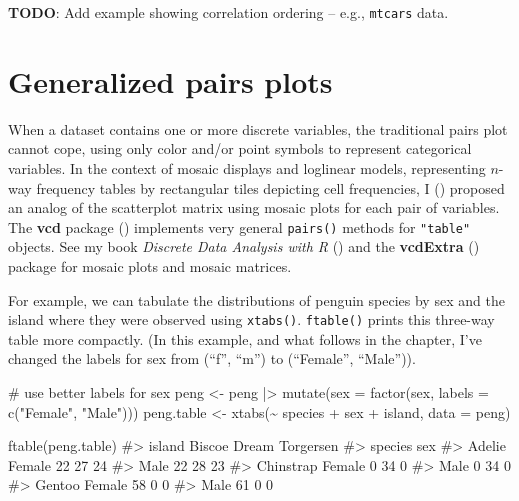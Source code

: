 \documentclass[
  letterpaper,
  10pt,
  krantz2]{krantz}
\makeatletter
\newenvironment{Shaded}{\begin{snugshade}}{\end{snugshade}}
\newcommand{\AttributeTok}[1]{\textcolor[rgb]{0.40,0.45,0.13}{#1}}
\newcommand{\CommentTok}[1]{\textcolor[rgb]{0.37,0.37,0.37}{#1}}
\newcommand{\FunctionTok}[1]{\textcolor[rgb]{0.28,0.35,0.67}{#1}}
\newcommand{\NormalTok}[1]{\textcolor[rgb]{0.00,0.23,0.31}{#1}}
\newcommand{\OtherTok}[1]{\textcolor[rgb]{0.00,0.23,0.31}{#1}}
\newcommand{\SpecialCharTok}[1]{\textcolor[rgb]{0.37,0.37,0.37}{#1}}
\newcommand{\StringTok}[1]{\textcolor[rgb]{0.13,0.47,0.30}{#1}}
\newenvironment{kframe}{%
  \medskip{}
  \setlength{\fboxsep}{.8em}
  \def\at@end@of@kframe{}%
  \ifinner\ifhmode%
  \def\at@end@of@kframe{\end{minipage}}%
  \begin{minipage}{\columnwidth}%
  \fi\fi%
  \def\FrameCommand##1{\hskip\@totalleftmargin \hskip-\fboxsep
  \colorbox{shadecolor}{##1}\hskip-\fboxsep
      \hskip-\linewidth \hskip-\@totalleftmargin \hskip\columnwidth}%
  \MakeFramed {\advance\hsize-\width
    \@totalleftmargin\z@ \linewidth\hsize
    \@setminipage}}%
{\par\unskip\endMakeFramed%
  \at@end@of@kframe}
\renewenvironment{Shaded}{\begin{kframe}}{\end{kframe}}
\makeatother
\begin{document}
\textbf{TODO}: Add example showing correlation ordering -- e.g.,
\texttt{mtcars} data.

\section{Generalized pairs plots}\label{sec-ggpairs}

When a dataset contains one or more discrete variables, the traditional
pairs plot cannot cope, using only color and/or point symbols to
represent categorical variables. In the context of mosaic displays and
loglinear models, representing \(n\)-way frequency tables by rectangular
tiles depicting cell frequencies, I
() proposed an analog of the
scatterplot matrix using mosaic plots for each pair of variables. The
\textbf{vcd} package ()
implements very general \texttt{pairs()} methods for \texttt{"table"}
objects. See my book \emph{Discrete Data Analysis with R}
() and
the \textbf{vcdExtra} ()
package for mosaic plots and mosaic matrices.

For example, we can tabulate the distributions of penguin species by sex
and the island where they were observed using \texttt{xtabs()}.
\texttt{ftable()} prints this three-way table more compactly. (In this
example, and what follows in the chapter, I've changed the labels for
sex from (``f'', ``m'') to (``Female'', ``Male'')).

\begin{Shaded}
\begin{Highlighting}[]
\CommentTok{\# use better labels for sex}
\NormalTok{peng }\OtherTok{\textless{}{-}}\NormalTok{ peng }\SpecialCharTok{|\textgreater{}}
  \FunctionTok{mutate}\NormalTok{(}\AttributeTok{sex =} \FunctionTok{factor}\NormalTok{(sex, }\AttributeTok{labels =} \FunctionTok{c}\NormalTok{(}\StringTok{"Female"}\NormalTok{, }\StringTok{"Male"}\NormalTok{)))}
\NormalTok{peng.table }\OtherTok{\textless{}{-}} \FunctionTok{xtabs}\NormalTok{(}\SpecialCharTok{\textasciitilde{}}\NormalTok{ species }\SpecialCharTok{+}\NormalTok{ sex }\SpecialCharTok{+}\NormalTok{ island, }\AttributeTok{data =}\NormalTok{ peng)}

\FunctionTok{ftable}\NormalTok{(peng.table)}
\CommentTok{\#\textgreater{}                  island Biscoe Dream Torgersen}
\CommentTok{\#\textgreater{} species   sex                                 }
\CommentTok{\#\textgreater{} Adelie    Female            22    27        24}
\CommentTok{\#\textgreater{}           Male              22    28        23}
\CommentTok{\#\textgreater{} Chinstrap Female             0    34         0}
\CommentTok{\#\textgreater{}           Male               0    34         0}
\CommentTok{\#\textgreater{} Gentoo    Female            58     0         0}
\CommentTok{\#\textgreater{}           Male              61     0         0}
\end{Highlighting}
\end{Shaded}
\end{document}

